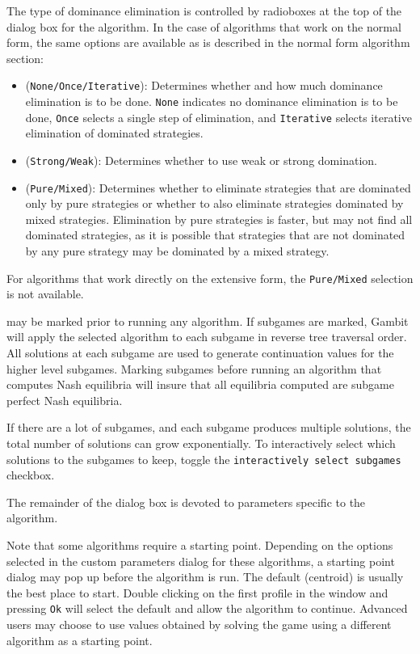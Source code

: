 {\begin{description}
The type of dominance elimination is controlled by radioboxes 
at the top of the dialog box for the algorithm.  In the case of algorithms that 
work on the normal form, the same options are available as is described in the 
normal form algorithm section: 
\begin{itemize}
\item ({\tt None/Once/Iterative}):  Determines whether and how much dominance 
elimination is to be done.  {\tt None} indicates no dominance elimination is to 
be done,  {\tt Once} selects a single step of elimination,
and {\tt Iterative} selects iterative elimination of dominated strategies.  
\item ({\tt Strong/Weak}): Determines whether to use weak or strong domination.  
\item ({\tt Pure/Mixed}): Determines whether to eliminate strategies that are 
dominated only by pure strategies or whether to also eliminate strategies 
dominated by mixed strategies.  Elimination by pure strategies is faster, but may 
not find all dominated strategies, as it is possible that strategies that are 
not dominated by any pure strategy may be dominated by a mixed strategy.  
\end{itemize}

For algorithms that work directly on the 
extensive form, the {\tt Pure/Mixed} selection is not available. 

\item[Subgames]  may be marked prior to running
any algorithm.  If subgames are marked, Gambit will apply the 
selected algorithm to each subgame in reverse tree traversal order.  All 
solutions at each subgame are used to generate continuation values for the 
higher level subgames.  Marking subgames before running an algorithm that 
computes Nash equilibria will insure that all equilibria computed are 
subgame perfect Nash equilibria.  

If there are a lot of subgames, and each subgame produces multiple 
solutions, the total number of solutions can grow exponentially.  
To interactively select which solutions to the subgames to keep, toggle 
the {\tt interactively select subgames} checkbox.  

\item[Algorithm parameters]  The remainder of the dialog box is devoted to 
parameters specific to the algorithm.  

\end{description}

Note that some algorithms require a starting point.  Depending on the
options selected in the custom parameters dialog for these algorithms,
a starting point dialog may pop up before the algorithm is run.  The
default (centroid) is usually the best place to start.  Double clicking on
the first profile in the window and pressing {\tt Ok} will select the
default and allow the algorithm to continue.  Advanced users may choose to
use values obtained by solving the game using a different algorithm as a
starting point.

}
